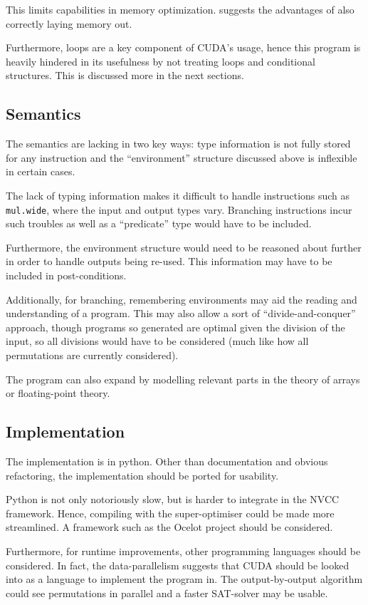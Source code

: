 \documentclass[letterpaper,twocolumn,10pt]{article}
\begin{document}
This limits capabilities in memory optimization. \cite{CUDALoops} suggests
the advantages of also correctly laying memory out.

Furthermore, loops are a key component of CUDA's usage, hence this program
is heavily hindered in its usefulness by not treating loops and conditional
structures. This is discussed more in the next sections.

\subsection{Semantics}

The semantics are lacking in two key ways: type information is not fully
stored for any instruction and the ``environment'' structure discussed
above is inflexible in certain cases.

The lack of typing information makes it difficult to handle instructions such
as \texttt{mul.wide}, where the input and output types vary. Branching instructions
incur such troubles as well as a ``predicate'' type would have to be included.

Furthermore, the environment structure would need to be reasoned about further
in order to handle outputs being re-used. This information may have to be
included in post-conditions.

Additionally, for branching, remembering environments may aid the reading
and understanding of a program.
This may also allow a sort of ``divide-and-conquer'' approach, though programs
so generated are optimal given the division of the input, so all divisions would
have to be considered (much like how all permutations are currently considered).

The program can also expand by modelling relevant parts in the theory of arrays
or floating-point theory.

\subsection{Implementation}

The implementation is in python. Other than documentation and obvious
refactoring, the implementation should be ported for usability.

Python is not only notoriously slow, but is harder to integrate in the
NVCC framework. Hence, compiling with the super-optimiser could be made more
streamlined. A framework such as \cite{GPUOcelot} the Ocelot project
should be considered.

Furthermore, for runtime improvements, other programming languages should be
considered. In fact, the data-parallelism suggests that CUDA should be looked into
as a language to implement the program in. The output-by-output algorithm
could see permutations in parallel and a faster SAT-solver may be usable.
\end{document}
